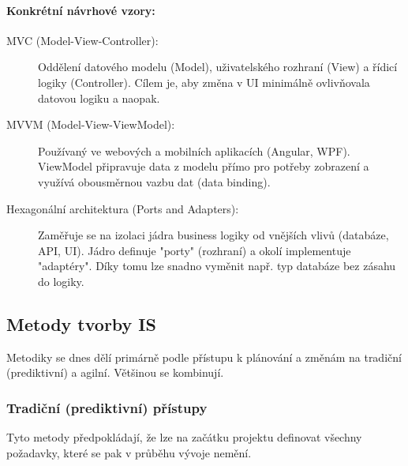 \paragraph*{Konkrétní návrhové vzory:}
\begin{description}
    \item[MVC (Model-View-Controller):] Oddělení datového modelu (Model), uživatelského rozhraní (View) a řídicí logiky (Controller). Cílem je, aby změna v UI minimálně ovlivňovala datovou logiku a naopak.

    \item[MVVM (Model-View-ViewModel):] Používaný ve webových a mobilních aplikacích (Angular, WPF). ViewModel připravuje data z modelu přímo pro potřeby zobrazení a využívá obousměrnou vazbu dat (data binding).

    \item[Hexagonální architektura (Ports and Adapters):] Zaměřuje se na izolaci jádra business logiky od vnějších vlivů (databáze, API, UI). Jádro definuje "porty" (rozhraní) a okolí implementuje "adaptéry". Díky tomu lze snadno vyměnit např. typ databáze bez zásahu do logiky.
\end{description}

\subsection{Metody tvorby IS}
Metodiky se dnes dělí primárně podle přístupu k plánování a změnám na 
tradiční (prediktivní) a agilní. Většinou se kombinují.

\subsubsection{Tradiční (prediktivní) přístupy}
Tyto metody předpokládají, že lze na začátku projektu definovat všechny požadavky, které se pak v průběhu vývoje nemění.

